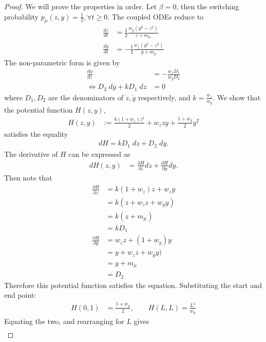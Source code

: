\documentclass[10pt]{article}
\begin{document}
\begin{proof}
    We will prove the properties in order. Let $\beta=0$, then the switching probability $p_\mu(z,y)=\frac{1}{2}, \forall t\geq 0$. The coupled ODEs reduce to
    \begin{align*}
        \frac{dz}{dt} &= \frac{1}{2}\frac{w_y(y^2 - z^2)}{z+m_\mu} \\[0.2em]
        \frac{dy}{dt} &= -\frac{1}{2}\frac{w_z(y^2 - z^2)}{y+m_\mu} 
    \end{align*}
    The non-parametric form is given by
    \begin{align*}
        \frac{dy}{dz} &= -\frac{w_zD_1}{w_yD_2}\\
        \Leftrightarrow D_2\;dy + kD_1\; dz &= 0
    \end{align*}
    where $D_1,D_2$ are the denominators of $\dot{z},\dot{y}$ respectively, and $k = \frac{w_z}{w_y}$. 
    We show that the potential function $H(z,y)$,    
    \begin{align*}
        H(z,y) &:= \frac{k(1+w_z)z^2}{2} + w_zzy + \frac{1+w_y}{2}y^2
    \end{align*}
    satisfies the equality
     \begin{align*}
        dH = kD_1\; dz + D_2\;dy.
    \end{align*}
    The derivative of $H$ can be expressed as  
    \begin{align*}
        dH(z,y) &= \frac{\partial H}{\partial z} dz + \frac{\partial H}{\partial y} dy.
    \end{align*}
    Then note that 
    \begin{align*}
        \frac{\partial H}{\partial z} &= k(1+w_z)z+w_zy\\ &= k(z+w_zz + w_yy)\\
        &= k(z+m_\mu)\\
        & = kD_1\\
        \frac{\partial H}{\partial y} &= w_zz+(1+w_y)y\\ &= y+w_zz + w_yy)\\
        &= y+m_\mu\\
        & = D_2
    \end{align*}
    Therefore this potential function satisfies the equation. Substituting the start and end point:
    \begin{align*}
        H(0,1) &= \frac{1+w_y}{2},\qquad H(L,L) = \frac{L^2}{w_y}
    \end{align*}
    Equating the two, and rearranging for $L$ gives
    \begin{align*}

\end{align*}
\end{proof}
\end{document}
